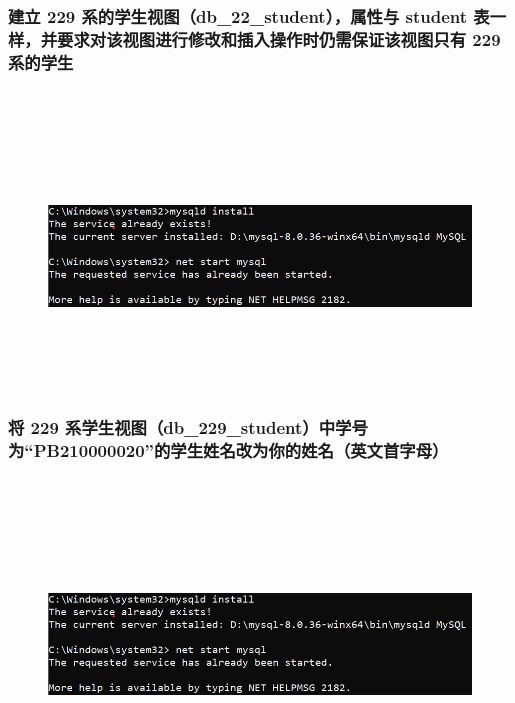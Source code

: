\documentclass{ctexart}
\begin{document}
\subsubsection{建立 229 系的学生视图（db\_22\_student），属性与 student 表一样，并要求对该视图进行修改和插入操作时仍需保证该视图只有 229 系的学生}
\begin{lstlisting}[language=sql]
	
\end{lstlisting}
\begin{figure}[H]
	\centering 
	\includegraphics[height=7cm,width=14cm]{1.png}
	\end{figure}
\subsubsection{将 229 系学生视图（db\_229\_student）中学号为“PB210000020”的学生姓名改为{你的姓名（英文首字母）}}
\begin{lstlisting}[language=sql]
	
\end{lstlisting}
\begin{figure}[H]
	\centering 
	\includegraphics[height=7cm,width=14cm]{1.png}
	\end{figure}
\end{document}
